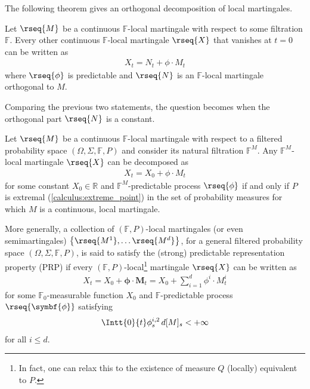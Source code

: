     The following theorem gives an orthogonal decomposition of local martingales.
    \begin{theorem}
        Let $\rseq{M}$ be a continuous $\mathbb{F}$-local martingale with respect to some filtration $\mathbb{F}$. Every other continuous $\mathbb{F}$-local martingale $\rseq{X}$ that vanishes at $t=0$ can be written as
        \begin{gather}
            X_t = N_t + \phi\cdot M_t
        \end{gather}
        where $\rseq{\phi}$ is predictable and $\rseq{N}$ is an $\mathbb{F}$-local martingale orthogonal to $M$.
    \end{theorem}

    Comparing the previous two statements, the question becomes when the orthogonal part $\rseq{N}$ is a constant.
    \begin{theorem}\label{stoch:prp}
        Let $\rseq{M}$ be a continuous $\mathbb{F}$-local martingale with respect to a filtered probability space $(\Omega,\Sigma,\mathbb{F},P)$ and consider its natural filtration $\mathbb{F}^M$. Any $\mathbb{F}^M$-local martingale $\rseq{X}$ can be decomposed as
        \begin{gather}
            X_t = X_0 + \phi\cdot M_t
        \end{gather}
        for some constant $X_0\in\mathbb{R}$ and $\mathbb{F}^M$-predictable process $\rseq{\phi}$ if and only if $P$ is extremal (\cref{calculus:extreme_point}) in the set of probability measures for which $M$ is a continuous, local martingale.
    \end{theorem}

    \begin{remark}[Generalization]
        More generally, a collection of $(\mathbb{F},P)$-local martingales (or even semimartingales) $\bigl\{\rseq{M^1},\ldots\rseq{M^d}\bigr\}$, for a general filtered probability space $(\Omega,\Sigma,\mathbb{F},P)$, is said to satisfy the (strong) predictable representation property (PRP) if every $(\mathbb{F},P)$-local\footnote{In fact, one can relax this to the existence of measure $Q$ (locally) equivalent to $P$.} martingale $\rseq{X}$ can be written as
        \begin{gather}
            X_t = X_0 + \symbf{\phi}\cdot\symbf{M}_t = X_0 + \sum_{i=1}^d\phi^i\cdot M^i_t
        \end{gather}
        for some $\mathbb{F}_0$-measurable function $X_0$ and $\mathbb{F}$-predictable process $\rseq{\symbf{\phi}}$ satisfying
        \begin{gather}
            \Intt{0}{t}\phi_s^{i,2}\,d[M]_s<+\infty
        \end{gather}
        for all $i\leq d$.
    \end{remark}

